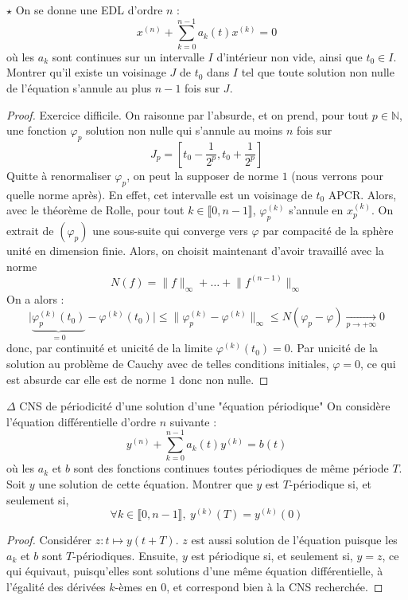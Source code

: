 \documentclass[french,a4paper]{article}
\newcommand{\N}{\mathbb{N}}
\theoremstyle{plain}
\theoremstyle{definition}
\theoremstyle{remark}
\begin{document}
\begin{ex}[Moulin.ED.52]{$\star$}
	On se donne une EDL d'ordre $n$ : $$x^{(n)}+\sum_{k=0}^{n-1}a_k(t)x^{(k)}=0$$ où les $a_k$ sont continues sur un intervalle $I$ d'intérieur non vide, ainsi que $t_0\in I$. Montrer qu'il existe un voisinage $J$ de $t_0$ dans $I$ tel que toute solution non nulle de l'équation s'annule au plus $n-1$ fois sur $J$.
\end{ex}
\begin{proof}
	Exercice difficile. On raisonne par l'absurde, et on prend, pour tout $p\in\N$, une fonction $\varphi_p$ solution non nulle qui s'annule au moins $n$ fois sur $$J_p=\left[t_0-\frac{1}{2^p},t_0+\frac{1}{2^p}\right]$$ Quitte à renormaliser $\varphi_p$, on peut la supposer de norme $1$ (nous verrons pour quelle norme après). En effet, cet intervalle est un voisinage de $t_0$ APCR. Alors, avec le théorème de Rolle, pour tout $k\in\llbracket0,n-1\rrbracket$, $\varphi_p^{(k)}$ s'annule en $x_p^{(k)}$. On extrait de $(\varphi_p)$ une sous-suite qui converge vers $\varphi$ par compacité de la sphère unité en dimension finie. Alors, on choisit maintenant d'avoir travaillé avec la norme $$N(f)=\lVert f\rVert_\infty+\ldots+\lVert f^{(n-1)}\rVert_\infty$$ On a alors : $$\lvert \underbrace{\varphi_p^{(k)}(t_0)}_{=0}-\varphi^{(k)}(t_0)\rvert \leqslant \lVert \varphi_p^{(k)}-\varphi^{(k)}\rVert_\infty\leqslant N(\varphi_p-\varphi)\xrightarrow[p\to+\infty]{}0$$ donc, par continuité et unicité de la limite $\varphi^{(k)}(t_0)=0$. Par unicité de la solution au problème de Cauchy avec de telles conditions initiales, $\varphi=0$, ce qui est absurde car elle est de norme $1$ donc non nulle.
\end{proof}

\begin{ex}{$\Delta$ CNS de périodicité d'une solution d'une "équation périodique"}
	On considère l'équation différentielle d'ordre $n$ suivante : $$y^{(n)}+\sum_{k=0}^{n-1}a_k(t)y^{(k)}=b(t)$$ où les $a_k$ et $b$ sont des fonctions continues toutes périodiques de même période $T$. Soit $y$ une solution de cette équation. Montrer que $y$ est $T$-périodique si, et seulement si, $$\forall k\in\llbracket0,n-1\rrbracket,\ y^{(k)}(T)=y^{(k)}(0)$$
\end{ex}
\begin{proof}
	Considérer $z:t\mapsto y(t+T)$. $z$ est aussi solution de l'équation puisque les $a_k$ et $b$ sont $T$-périodiques. Ensuite, $y$ est périodique si, et seulement si, $y=z$, ce qui équivaut, puisqu'elles sont solutions d'une même équation différentielle, à l'égalité des dérivées $k$-èmes en $0$, et correspond bien à la CNS recherchée.
\end{proof}
\end{document}
